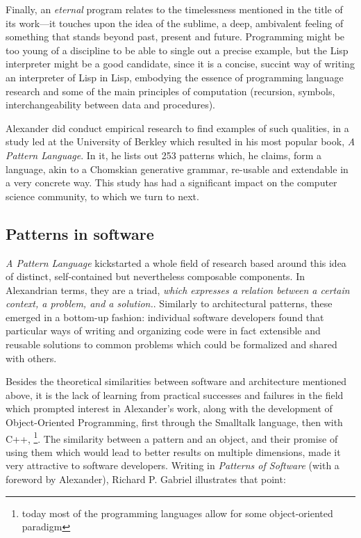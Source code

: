 \documentclass{article}
\begin{document}
Finally, an \emph{eternal} program relates to the timelessness mentioned in the title of its work—it touches upon the idea of the sublime, a deep, ambivalent feeling of something that stands beyond past, present and future. Programming might be too young of a discipline to be able to single out a precise example, but the Lisp interpreter might be a good candidate, since it is a concise, succint way of writing an interpreter of Lisp in Lisp, embodying the essence of programming language research and some of the main principles of computation (recursion, symbols, interchangeability between data and procedures).

Alexander did conduct empirical research to find examples of such qualities, in a study led at the University of Berkley which resulted in his most popular book, \emph{A Pattern Language}\cite{alexander_pattern_1977}. In it, he lists out 253 patterns which, he claims, form a language, akin to a Chomskian generative grammar, re-usable and extendable in a very concrete way. This study has had a significant impact on the computer science community, to which we turn to next.

\subsection{Patterns in software}

\emph{A Pattern Language} kickstarted a whole field of research based around this idea of distinct, self-contained but nevertheless composable components. In Alexandrian terms, they are a triad, \emph{which expresses a relation between a certain context, a problem, and a solution.}. Similarly to architectural patterns, these emerged in a bottom-up fashion: individual software developers found that particular ways of writing and organizing code were in fact extensible and reusable solutions to common problems which could be formalized and shared with others.

Besides the theoretical similarities between software and architecture mentioned above, it is the lack of learning from practical successes and failures in the field which prompted interest in Alexander's work, along with the development of Object-Oriented Programming, first through the Smalltalk language, then with C++, \footnote{today most of the programming languages allow for some object-oriented paradigm}. The similarity between a pattern and an object, and their promise of using them which would lead to better results on multiple dimensions, made it very attractive to software developers. Writing in \emph{Patterns of Software} (with a foreword by Alexander), Richard P. Gabriel illustrates that point:
\end{document}
